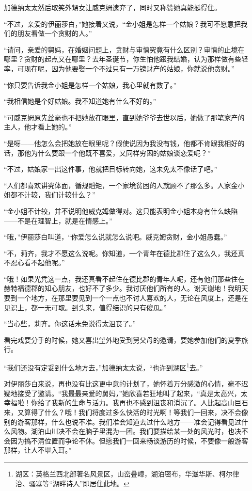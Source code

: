 \par 加德纳太太然后取笑外甥女让威克姆遗弃了，同时又称赞她真能挺得住。
\par “不过，亲爱的伊丽莎白，”她接着又说，“金小姐是怎样一个姑娘？我可不愿意把我们的朋友看做一个贪财的人。”
\par “请问，亲爱的舅妈，在婚姻问题上，贪财与审慎究竟有什么区别？审慎的止境在哪里？贪财的起点又在哪里？去年圣诞节，你生怕他跟我结婚，认为那样做有些轻率，可现在呢，因为他要娶一个不过只有一万镑财产的姑娘，你就说他贪财。”
\par “你只要告诉我金小姐是怎样一个姑娘，我心里就有数了。”
\par “我相信她是个好姑娘。我不知道她有什么不好的。”
\par “可威克姆原先丝毫也不把她放在眼里，直到她爷爷去世以后，她做了那笔家产的主人，他才看上她的。”
\par “是呀——他怎么会把她放在眼里呢？假使说因为我没有钱，他都不肯跟我相好的话，那他为什么要跟一个他既不喜爱，又同样穷困的姑娘谈恋爱呢？”
\par “不过，姑娘家一出这件事，他就把目标转向她，这未免太不像话了吧。”
\par “人们都喜欢讲究体面，循规蹈矩，一个家境贫困的人就顾不了那么多。人家金小姐都不计较，我们计较什么？”
\par “金小姐不计较，并不说明他威克姆做得对。这只能表明金小姐本身有什么缺陷——不是在理智上，就是在情感上。”
\par “哦，”伊丽莎白叫道，“你爱怎么说就怎么说吧。威克姆贪财，金小姐愚蠢。”
\par “不，莉齐，我才不愿这么说呢。你知道，一个青年在德比郡住了这么久，我还真不忍心看不起他呢。”
\par “哦！如果光凭这一点，我还真看不起住在德比郡的青年人呢，还有他们那些住在赫特福德郡的知心朋友，也好不了多少。我讨厌他们所有的人。谢天谢地！我明天要到一个地方，在那里要见到一个一点也不讨人喜欢的人，无论在风度上，还是在见识上，都一无可取。到头来，值得结识的只有傻瓜。”
\par “当心些，莉齐。你这话未免说得太沮丧了。”
\par 看完戏要分手的时候，她又喜出望外地受到舅父母的邀请，要她参加他们的夏季旅行。
\par “我们还没有定妥到什么地方去，”加德纳太太说，“也许到湖区\footnote{湖区：英格兰西北部著名风景区，山峦叠嶂，湖泊密布，华滋华斯、柯尔律治、骚塞等“湖畔诗人”即居住此地。}去。”
\par 对伊丽莎白来说，再也没有比这更中意的计划了，她怀着万分感激的心情，毫不迟疑地接受了邀请。“我最最亲爱的舅妈，”她欣喜若狂地叫了起来，“真是太高兴，太幸福啦！你给了我新的生命与活力。我再也不感到沮丧和消沉了。人比起高山巨石来，又算得了什么？哦！我们将度过多么快活的时光啊！等我们一回来，决不会像别的游客那样，什么也说不准。我们准会知道去过什么地方——准会记得看见过什么风物。湖泊山川决不会在脑子里混为一团。我们要描绘某一处的风光时，也决不会因为搞不清位置而争论不休。但愿我们一回来畅谈游历的时候，不要像一般游客那样，让人不堪入耳。”




